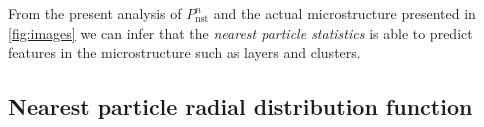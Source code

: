 From the present analysis of $P_\text{nst}^n$ and the actual microstructure presented in \ref{fig:images} we can infer that the \textit{nearest particle statistics} is able to predict features in the microstructure such as layers and clusters. 


\subsection{Nearest particle radial distribution function }

